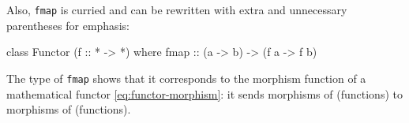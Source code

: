 Also, \texttt{fmap} is curried and can be rewritten with extra and
unnecessary parentheses for emphasis:
\begin{codehaskell}
  class Functor (f :: * -> *) where
    fmap :: (a -> b) -> (f a -> f b)
\end{codehaskell}
The type of \texttt{fmap} shows that it corresponds to the morphism
function of a mathematical functor \eqref{eq:functor-morphism}: it sends
morphisms of \hask (functions) to morphisms of \hask (functions).







